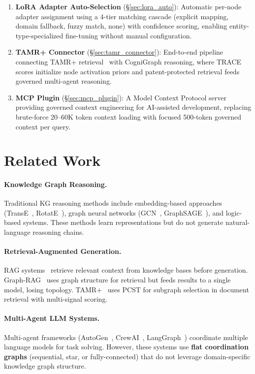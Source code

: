 \documentclass[a4paper,11pt]{article}
\theoremstyle{definition}
\begin{document}
\begin{enumerate}
\item \textbf{LoRA Adapter Auto-Selection} (\S\ref{sec:lora_auto}): Automatic per-node adapter assignment using a 4-tier matching cascade (explicit mapping, domain fallback, fuzzy match, none) with confidence scoring, enabling entity-type-specialized fine-tuning without manual configuration.
\item \textbf{TAMR+ Connector} (\S\ref{sec:tamr_connector}): End-to-end pipeline connecting TAMR+ retrieval~\cite{tamrplus2026} with CogniGraph reasoning, where TRACE scores initialize node activation priors and patent-protected retrieval feeds governed multi-agent reasoning.
\item \textbf{MCP Plugin} (\S\ref{sec:mcp_plugin}): A Model Context Protocol server providing governed context engineering for AI-assisted development, replacing brute-force 20--60K token context loading with focused 500-token governed context per query.
\end{enumerate}

\section{Related Work}
\label{sec:related}

\paragraph{Knowledge Graph Reasoning.}
Traditional KG reasoning methods include embedding-based approaches (TransE~\cite{transe2013}, RotatE~\cite{rotate2019}), graph neural networks (GCN~\cite{gcn2017}, GraphSAGE~\cite{graphsage2017}), and logic-based systems.
These methods learn representations but do not generate natural-language reasoning chains.

\paragraph{Retrieval-Augmented Generation.}
RAG systems~\cite{rag2020,graphrag2024} retrieve relevant context from knowledge bases before generation.
Graph-RAG~\cite{graphrag2024} uses graph structure for retrieval but feeds results to a single model, losing topology.
TAMR+~\cite{tamrplus2026} uses PCST for subgraph selection in document retrieval with multi-signal scoring.

\paragraph{Multi-Agent LLM Systems.}
Multi-agent frameworks (AutoGen~\cite{autogen2023}, CrewAI~\cite{crewai2024}, LangGraph~\cite{langgraph2024}) coordinate multiple language models for task solving.
However, these systems use \textbf{flat coordination graphs} (sequential, star, or fully-connected) that do not leverage domain-specific knowledge graph structure.
\end{document}
